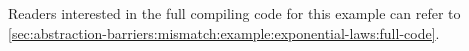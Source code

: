 Readers interested in the full compiling code for this example can refer to \autoref{sec:abstraction-barriers:mismatch:example:exponential-laws:full-code}.



\begin{comment}
\begin{verbatim}
Require Import Coq.Arith.Arith.
Require Import Coq.Program.Basics.
Require Import Coq.micromega.Lia.
Require Import Coq.Lists.List.
Require Import Coq.Logic.Eqdep_dec.
Import ListNotations.
Local Open Scope list_scope.
Declare Scope vector_scope.
Delimit Scope vector_scope with vector.
Local Open Scope vector_scope.
Local Set Primitive Projections.
Set Implicit Arguments.
Import EqNotations.


\end{comment}
